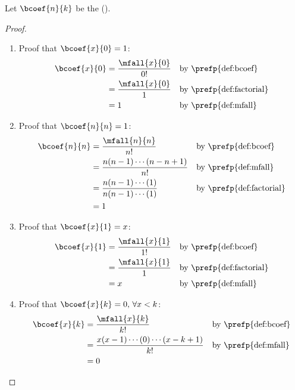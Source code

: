 \begin{proposition}
\label{prop:bcoef}
Let $\bcoef{n}{k}$ be the  ().
\end{proposition}
\begin{proof}
\begin{enumerate}
  \item Proof that $\bcoef{x}{0}=1$:
    \begin{align*}
      \bcoef{x}{0}
        &= \frac{\mfall{x}{0}}{0!}
        && \text{by \prefp{def:bcoef}}
      \\&= \frac{\mfall{x}{0}}{1}
        && \text{by \prefp{def:factorial}}
      \\&= 1
        && \text{by \prefp{def:mfall}}
    \end{align*}

  \item Proof that $\bcoef{n}{n}=1$:
    \begin{align*}
      \bcoef{n}{n}
        &= \frac{\mfall{n}{n}}{n!}
        && \text{by \prefp{def:bcoef}}
      \\&= \frac{n(n-1)\cdots(n-n+1)}{n!}
        && \text{by \prefp{def:mfall}}
      \\&= \frac{n(n-1)\cdots(1)}{n(n-1)\cdots(1)}
        && \text{by \prefp{def:factorial}}
      \\&= 1
    \end{align*}

  \item Proof that $\bcoef{x}{1}=x$:
    \begin{align*}
      \bcoef{x}{1}
        &= \frac{\mfall{x}{1}}{1!}
        && \text{by \prefp{def:bcoef}}
      \\&= \frac{\mfall{x}{1}}{1}
        && \text{by \prefp{def:factorial}}
      \\&= x
        && \text{by \prefp{def:mfall}}
    \end{align*}

  \item Proof that $\bcoef{x}{k}=0,\,\forall x<k$:
    \begin{align*}
      \bcoef{x}{k}
        &= \frac{\mfall{x}{k}}{k!}
        && \text{by \prefp{def:bcoef}}
      \\&= \frac{x(x-1)\cdots(0)\cdots(x-k+1)}{k!}
        && \text{by \prefp{def:mfall}}
      \\&= 0
    \end{align*}
\end{enumerate}
\end{proof}

